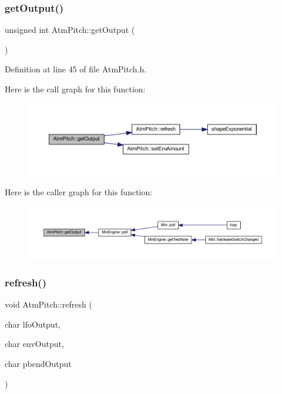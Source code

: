 \subsubsection{\texorpdfstring{get\+Output()}{getOutput()}}
{\footnotesize\ttfamily unsigned int Atm\+Pitch\+::get\+Output (\begin{DoxyParamCaption}{ }\end{DoxyParamCaption})\hspace{0.3cm}{\ttfamily [inline]}}



Definition at line 45 of file Atm\+Pitch.\+h.

Here is the call graph for this function\+:
\nopagebreak
\begin{figure}[H]
\begin{center}
\leavevmode
\includegraphics[width=350pt]{class_atm_pitch_a30b8bb597d3f1ce75a0394d2dd510004_cgraph}
\end{center}
\end{figure}
Here is the caller graph for this function\+:
\nopagebreak
\begin{figure}[H]
\begin{center}
\leavevmode
\includegraphics[width=350pt]{class_atm_pitch_a30b8bb597d3f1ce75a0394d2dd510004_icgraph}
\end{center}
\end{figure}
\mbox{\label{class_atm_pitch_a2fc4d9ea4f73818022f9512a656b9572}} 
\subsubsection{\texorpdfstring{refresh()}{refresh()}}
{\footnotesize\ttfamily void Atm\+Pitch\+::refresh (\begin{DoxyParamCaption}\item[{char}]{lfo\+Output,  }\item[{char}]{env\+Output,  }\item[{char}]{pbend\+Output }\end{DoxyParamCaption})}



